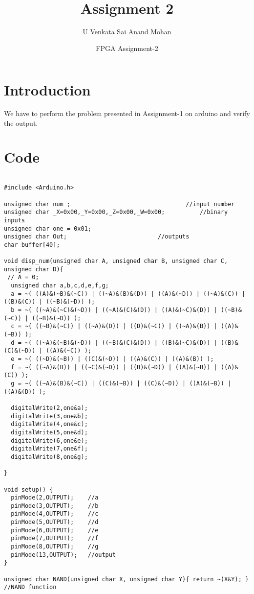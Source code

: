 \documentclass{article}
\title{Assignment 2}
\author{U Venkata Sai Anand Mohan}
\date{FPGA Assignment-2}
\begin{document}
\maketitle

\section{Introduction}

We have to perform the problem presented in Assignment-1 on arduino and verify the output.

\section{Code}

\begin{verbatim}

#include <Arduino.h>

unsigned char num ;                             	//input number
unsigned char _X=0x00,_Y=0x00,_Z=0x00,_W=0x00;      	//binary inputs
unsigned char one = 0x01;
unsigned char Out;                         	//outputs
char buffer[40];

void disp_num(unsigned char A, unsigned char B, unsigned char C, unsigned char D){
 // A = 0;
  unsigned char a,b,c,d,e,f,g;
  a = ~( ((A)&(~B)&(~C)) | ((~A)&(B)&(D)) | ((A)&(~D)) | ((~A)&(C)) | ((B)&(C)) | ((~B)&(~D)) );
  b = ~( ((~A)&(~C)&(~D)) | ((~A)&(C)&(D)) | ((A)&(~C)&(D)) | ((~B)&(~C)) | ((~B)&(~D)) );
  c = ~( ((~B)&(~C)) | ((~A)&(D)) | ((D)&(~C)) | ((~A)&(B)) | ((A)&(~B)) );
  d = ~( ((~A)&(~B)&(~D)) | ((~B)&(C)&(D)) | ((B)&(~C)&(D)) | ((B)&(C)&(~D)) | ((A)&(~C)) );
  e = ~( ((~D)&(~B)) | ((C)&(~D)) | ((A)&(C)) | ((A)&(B)) );
  f = ~( ((~A)&(B)) | ((~C)&(~D)) | ((B)&(~D)) | ((A)&(~B)) | ((A)&(C)) );
  g = ~( ((~A)&(B)&(~C)) | ((C)&(~B)) | ((C)&(~D)) | ((A)&(~B)) | ((A)&(D)) );

  digitalWrite(2,one&a);
  digitalWrite(3,one&b);
  digitalWrite(4,one&c);
  digitalWrite(5,one&d);
  digitalWrite(6,one&e);
  digitalWrite(7,one&f);
  digitalWrite(8,one&g);

}

void setup() {
  pinMode(2,OUTPUT);    //a
  pinMode(3,OUTPUT);    //b
  pinMode(4,OUTPUT);    //c
  pinMode(5,OUTPUT);    //d
  pinMode(6,OUTPUT);    //e
  pinMode(7,OUTPUT);    //f
  pinMode(8,OUTPUT);    //g
  pinMode(13,OUTPUT);   //output
}

unsigned char NAND(unsigned char X, unsigned char Y){ return ~(X&Y); } //NAND function


\end{verbatim}
\end{document}
